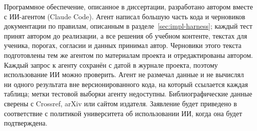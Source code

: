 Программное обеспечение, описанное в диссертации, разработано автором вместе с ИИ-агентом (Claude Code).
Агент написал большую часть кода и черновиков документации по правилам, описанным в
разделе~\ref{sec:impl-harness}; каждый тест принят автором до реализации, а все решения об учебном
контенте, текстах для ученика, порогах, согласии и данных принимал автор. Черновики этого текста
подготовлены тем же агентом по материалам проекта и отредактированы автором. Каждый запрос к агенту
сохранён с датой в журнале проекта, поэтому использование ИИ можно проверить. Агент не размечал данные
и не вычислял ни одного результата вне версионированного кода, на который ссылается каждая таблица;
метки тестовой выборки агенту недоступны.
Библиографические данные сверены с Crossref, arXiv или сайтом издателя. Заявление будет приведено в
соответствие с политикой университета об использовании ИИ, когда она будет подтверждена.
